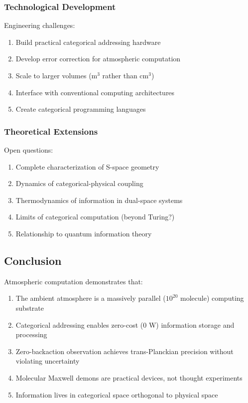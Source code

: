 \subsubsection{Technological Development}

Engineering challenges:
\begin{enumerate}
\item Build practical categorical addressing hardware
\item Develop error correction for atmospheric computation
\item Scale to larger volumes (m$^3$ rather than cm$^3$)
\item Interface with conventional computing architectures
\item Create categorical programming languages
\end{enumerate}

\subsubsection{Theoretical Extensions}

Open questions:
\begin{enumerate}
\item Complete characterization of S-space geometry
\item Dynamics of categorical-physical coupling
\item Thermodynamics of information in dual-space systems
\item Limits of categorical computation (beyond Turing?)
\item Relationship to quantum information theory
\end{enumerate}

\subsection{Conclusion}

Atmospheric computation demonstrates that:

\begin{enumerate}
\item The ambient atmosphere is a massively parallel ($10^{20}$ molecule) computing substrate
\item Categorical addressing enables zero-cost ($0$ W) information storage and processing
\item Zero-backaction observation achieves trans-Planckian precision without violating uncertainty
\item Molecular Maxwell demons are practical devices, not thought experiments
\item Information lives in categorical space orthogonal to physical space
\end{enumerate}

